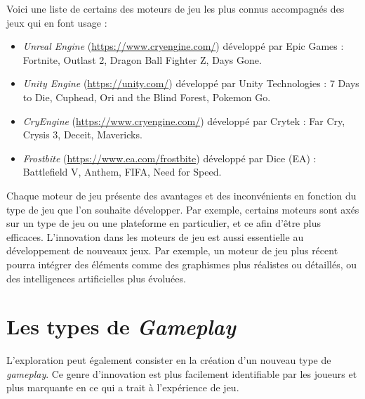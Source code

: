 Voici une liste de certains des moteurs de jeu les plus connus accompagnés des jeux qui en font usage : 
\begin{itemize}
    \item \emph{Unreal Engine} (\url{https://www.cryengine.com/}) développé par Epic Games : Fortnite, Outlast 2, Dragon Ball Fighter Z, Days Gone.
    \item \emph{Unity Engine} (\url{https://unity.com/}) développé par Unity Technologies : 7 Days to Die, Cuphead, Ori and the Blind Forest, Pokemon Go.
    \item \emph{CryEngine} (\url{https://www.cryengine.com/}) développé par Crytek : Far Cry, Crysis 3, Deceit, Mavericks.
    \item \emph{Frostbite} (\url{https://www.ea.com/frostbite}) développé par Dice (EA) : Battlefield V, Anthem, FIFA, Need for Speed.
\end{itemize}

Chaque moteur de jeu présente des avantages et des inconvénients en fonction du type de jeu que l'on souhaite développer.
Par exemple, certains moteurs sont axés sur un type de jeu ou une plateforme en particulier, et ce afin d'être plus efficaces. 
L'innovation dans les moteurs de jeu est aussi essentielle au développement de nouveaux jeux. 
Par exemple, un moteur de jeu plus récent pourra intégrer des éléments comme des graphismes plus réalistes ou détaillés, ou des intelligences artificielles plus évoluées.

\section{Les types de \emph{Gameplay}}
L'exploration peut également consister en la création d'un nouveau type de \emph{gameplay}.
Ce genre d'innovation est plus facilement identifiable par les joueurs et plus marquante en ce qui a trait \`a l'expérience de jeu. 



